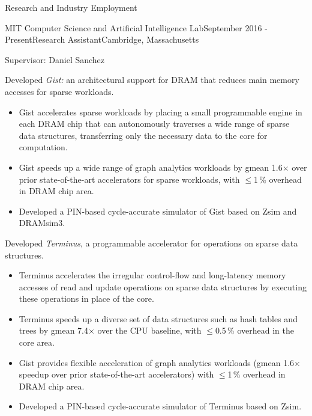 \documentclass{resume} %
\begin{document}
\begin{rSection}{Research and Industry Employment}

\begin{rSubsection}{MIT Computer Science and Artificial Intelligence Lab}{September 2016 - Present}{Research Assistant}{Cambridge, Massachusetts}

\item Supervisor: Daniel Sanchez
\item Developed {\it Gist:} an architectural support for DRAM that reduces main memory accesses for sparse workloads.
    \vspace{-0.2cm}
    \begin{itemize}
    \item Gist accelerates sparse workloads by placing a small programmable engine in each DRAM chip that can autonomously traverses 
        a wide range of sparse data structures, transferring only the necessary data to the core for computation.
    \item Gist speeds up a wide range of graph analytics workloads by gmean 1.6$\times$ over prior state-of-the-art accelerators for sparse workloads,
        with $\leq$1\,\% overhead in DRAM chip area.
    \item Developed a PIN-based cycle-accurate simulator of Gist based on Zsim and DRAMsim3.
    \end{itemize}
    \vspace{0.2cm}
\item Developed {\it Terminus}, a programmable accelerator for operations on sparse data structures.
    \vspace{-0.2cm}
    \begin{itemize}
    \item Terminus accelerates the irregular control-flow and long-latency memory accesses of read and update operations
        on sparse data structures by executing these operations in place of the core.
    \item Terminus speeds up a diverse set of data structures such as hash tables and trees by gmean 7.4$\times$ over the CPU baseline,
        with $\leq$0.5\,\% overhead in the core area.
    \item Gist provides flexible acceleration of graph analytics workloads (gmean 1.6$\times$ speedup over prior state-of-the-art accelerators)
    with $\leq$1\,\% overhead in DRAM chip area.
    \item Developed a PIN-based cycle-accurate simulator of Terminus based on Zsim.
    \end{itemize}

\end{rSubsection}
\end{rSection}
\end{document}

